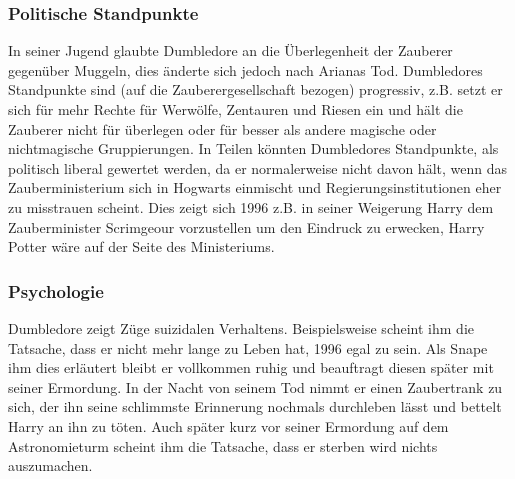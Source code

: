 \documentclass[a4paper, 10pt]{article}
\begin{document}
\subsubsection*{\large Politische Standpunkte}
In seiner Jugend glaubte Dumbledore an die Überlegenheit der Zauberer gegenüber Muggeln, dies änderte sich jedoch nach Arianas Tod. Dumbledores Standpunkte sind (auf die Zauberergesellschaft bezogen) progressiv, z.B. setzt er sich für mehr Rechte für Werwölfe, Zentauren und Riesen ein und hält die Zauberer nicht für überlegen oder für besser als andere magische oder nichtmagische Gruppierungen. In Teilen könnten Dumbledores Standpunkte, als politisch liberal gewertet werden, da er normalerweise nicht davon hält, wenn das Zauberministerium sich in Hogwarts einmischt und Regierungsinstitutionen eher zu misstrauen scheint. Dies zeigt sich 1996 z.B. in seiner Weigerung Harry dem Zauberminister Scrimgeour vorzustellen um den Eindruck zu erwecken, Harry Potter wäre auf der Seite des Ministeriums.
\subsubsection*{\large Psychologie}
Dumbledore zeigt Züge suizidalen Verhaltens. Beispielsweise scheint ihm die Tatsache, dass er nicht mehr lange zu Leben hat, 1996 egal zu sein. Als Snape ihm dies erläutert bleibt er vollkommen ruhig und beauftragt diesen später mit seiner Ermordung. In der Nacht von seinem Tod nimmt er einen Zaubertrank zu sich, der ihn seine schlimmste Erinnerung nochmals durchleben lässt und bettelt Harry an ihn zu töten. Auch später kurz vor seiner Ermordung auf dem Astronomieturm scheint ihm die Tatsache, dass er sterben wird nichts auszumachen.
\end{document}
